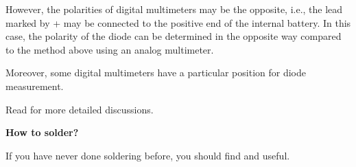 However, the polarities of digital multimeters may be the opposite, i.e., the 
lead marked by + may be connected to the positive end of the internal battery.
In this case, the polarity of the diode can be determined in the opposite way
compared to the method above using an analog multimeter. 

Moreover, some digital multimeters have a particular position for diode measurement. 

Read 
for more detailed discussions.

{\bf How to solder?} 

If you have never done soldering before, you should find 
and 
useful.




	

	


